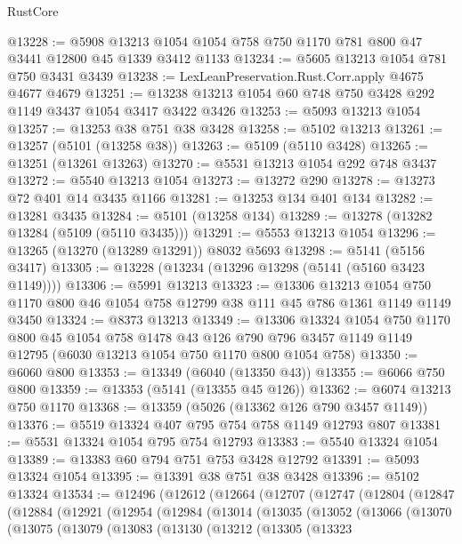 \begin{lexlean}{RustCore}
\begin{coremodule}
@13228 := @5908 @13213 @1054 @1054 @758 @750 @1170 @781 @800 @47 @3441 @12800 @45 @1339 @3412 @1133
@13234 := @5605 @13213 @1054 @781 @750 @3431 @3439
@13238 := LexLeanPreservation.Rust.Corr.apply @4675 @4677 @4679
@13251 := @13238 @13213 @1054 @60 @748 @750 @3428 @292 @1149 @3437 @1054 @3417 @3422 @3426
@13253 := @5093 @13213 @1054
@13257 := @13253 @38 @751 @38 @3428
@13258 := @5102 @13213
@13261 := @13257 (@5101 (@13258 @38))
@13263 := @5109 (@5110 @3428)
@13265 := @13251 (@13261 @13263)
@13270 := @5531 @13213 @1054 @292 @748 @3437
@13272 := @5540 @13213 @1054
@13273 := @13272 @290
@13278 := @13273 @72 @401 @14 @3435 @1166
@13281 := @13253 @134 @401 @134
@13282 := @13281 @3435
@13284 := @5101 (@13258 @134)
@13289 := @13278 (@13282 @13284 (@5109 (@5110 @3435)))
@13291 := @5553 @13213 @1054
@13296 := @13265 (@13270 (@13289 @13291)) @8032 @5693
@13298 := @5141 (@5156 @3417)
@13305 := @13228 (@13234 (@13296 @13298 (@5141 (@5160 @3423 @1149))))
@13306 := @5991 @13213
@13323 := @13306
    @13213
    @1054
    @750
    @1170
    @800
    @46
    @1054
    @758
    @12799
    @38
    @111
    @45
    @786
    @1361
    @1149
    @1149
    @3450
@13324 := @8373 @13213
@13349 := @13306
    @13324
    @1054
    @750
    @1170
    @800
    @45
    @1054
    @758
    @1478
    @43
    @126
    @790
    @796
    @3457
    @1149
    @1149
    @12795
    (@6030 @13213 @1054 @750 @1170 @800 @1054 @758)
@13350 := @6060 @800
@13353 := @13349 (@6040 (@13350 @43))
@13355 := @6066 @750 @800
@13359 := @13353 (@5141 (@13355 @45 @126))
@13362 := @6074 @13213 @750 @1170
@13368 := @13359 (@5026 (@13362 @126 @790 @3457 @1149))
@13376 := @5519 @13324 @407 @795 @754 @758 @1149 @12793 @807
@13381 := @5531 @13324 @1054 @795 @754 @12793
@13383 := @5540 @13324 @1054
@13389 := @13383 @60 @794 @751 @753 @3428 @12792
@13391 := @5093 @13324 @1054
@13395 := @13391 @38 @751 @38 @3428
@13396 := @5102 @13324
@13534 := @12496
    (@12612
      (@12664
        (@12707
          (@12747
            (@12804
              (@12847
                (@12884
                  (@12921
                    (@12954
                      (@12984
                        (@13014
                          (@13035
                            (@13052
                              (@13066
                                (@13070
                                  (@13075
                                    (@13079
                                      (@13083
                                        (@13130
                                          (@13212
                                            (@13305
                                              (@13323

\end{coremodule}
\end{lexlean}
